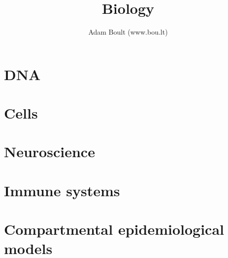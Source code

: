 \documentclass[oneside]{book}
\begin{document}
\author{Adam Boult (www.bou.lt)}
\title{Biology}
\maketitle

\setcounter{tocdepth}{0}
\tableofcontents



\part{DNA}



\part{Cells}





\part{Neuroscience}


\part{Immune systems}







\part{Compartmental epidemiological models}





\end{document}
